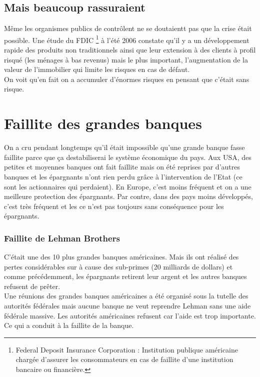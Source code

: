 \subsection{Mais beaucoup rassuraient}
Même les organismes publics de contrôlent ne se doutaientt pas que la crise était possible. Une étude du FDIC \footnote{Federal Deposit Insurance Corporation : Institution publique américaine chargée d'assurer les consommateurs en cas de faillite d'une institution bancaire ou financière.} à l'été 2006 constate qu'il y a un développement rapide des produits non traditionnels ainsi que leur extension à des clients à profil risqué (les ménages à bas revenus) mais le plus important, l'augmentation de la valeur de l'immobilier qui limite les risques en cas de défaut. \\
On voit qu'en fait on a accumuler d'énormes risques en pensant que c'était sans risque.

\section{Faillite des grandes banques}
On a cru pendant longtemps qu'il était impossible qu'une grande banque fasse faillite parce que ça destabiliserai le système économique du pays. Aux USA, des petites et moyennes banques ont fait faillite mais on été reprises par d'autres banques et les épargnants n'ont rien perdu grâce à l'intervention de l'Etat (ce sont les actionnaires qui perdaient). En Europe, c'est moins fréquent et on a une meilleure protection des épargnants. Par contre, dans des pays moins développés, c'est très fréquent et les ce n'est pas toujours sans conséquence pour les épargnants. 

\subsubsection{Faillite de Lehman Brothers}
C'était une des 10 plus grandes banques américaines. Mais ils ont réalisé des pertes considérables sur à cause des sub-primes (20 milliards de dollars) et comme précédemment, les épargnants retirent leur argent et les autres banques refusent de prêter. \\
Une réunions des grandes banques américaines a été organisé sous la tutelle des autorités fédérales mais aucune banque ne veut reprendre Lehman sans une aide fédérale massive. Les autorités américaines refusent car l'aide est trop importante. Ce qui a conduit à la faillite de la banque. 


